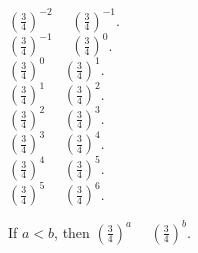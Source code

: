 \documentclass{ximera}
\author{Lee Wayand}
\begin{document}
\begin{example}


\begin{question}


$\left( \frac{3}{4} \right)^{-2}$ \, \wordChoice{\choice{$<$} \choice[correct]{$>$}} \, $\left( \frac{3}{4} \right)^{-1}$.  \\

$\left( \frac{3}{4} \right)^{-1}$ \, \wordChoice{\choice{$<$} \choice[correct]{$>$}} \, $\left( \frac{3}{4} \right)^{0}$.  \\

$\left( \frac{3}{4} \right)^{0}$ \, \wordChoice{\choice{$<$} \choice[correct]{$>$}} \, $\left( \frac{3}{4} \right)^{1}$.  \\

$\left( \frac{3}{4} \right)^{1}$ \, \wordChoice{\choice{$<$} \choice[correct]{$>$}} \, $\left( \frac{3}{4} \right)^{2}$.  \\

$\left( \frac{3}{4} \right)^{2}$ \, \wordChoice{\choice{$<$} \choice[correct]{$>$}} \, $\left( \frac{3}{4} \right)^{3}$.  \\

$\left( \frac{3}{4} \right)^{3}$ \, \wordChoice{\choice{$<$} \choice[correct]{$>$}} \, $\left( \frac{3}{4} \right)^{4}$.  \\

$\left( \frac{3}{4} \right)^{4}$ \, \wordChoice{\choice{$<$} \choice[correct]{$>$}} \, $\left( \frac{3}{4} \right)^{5}$.  \\

$\left( \frac{3}{4} \right)^{5}$ \, \wordChoice{\choice{$<$} \choice[correct]{$>$}} \, $\left( \frac{3}{4} \right)^{6}$.  \\


\end{question}




\begin{question}



If $a < b$, then $\left( \frac{3}{4} \right)^{a}$ \, \wordChoice{\choice{$<$} \choice[correct]{$>$}} \, $\left( \frac{3}{4} \right)^{b}$.  \\



\end{question}





\begin{question}




\end{question}
\end{example}
\end{document}
